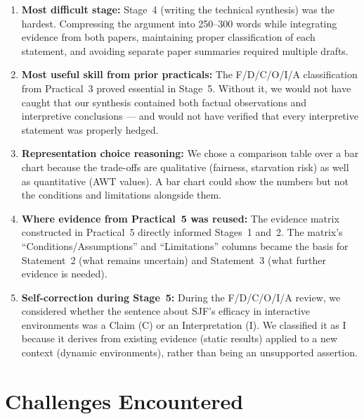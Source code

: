 \documentclass[11pt, a4paper]{article}
\begin{document}
\begin{enumerate}[nosep]
    \item \textbf{Most difficult stage:} Stage~4 (writing the technical synthesis) was the hardest. Compressing the argument into 250--300 words while integrating evidence from both papers, maintaining proper classification of each statement, and avoiding separate paper summaries required multiple drafts.

    \item \textbf{Most useful skill from prior practicals:} The F/D/C/O/I/A classification from Practical~3 proved essential in Stage~5. Without it, we would not have caught that our synthesis contained both factual observations and interpretive conclusions --- and would not have verified that every interpretive statement was properly hedged.

    \item \textbf{Representation choice reasoning:} We chose a comparison table over a bar chart because the trade-offs are qualitative (fairness, starvation risk) as well as quantitative (AWT values). A bar chart could show the numbers but not the conditions and limitations alongside them.

    \item \textbf{Where evidence from Practical~5 was reused:} The evidence matrix constructed in Practical~5 directly informed Stages~1 and~2. The matrix's ``Conditions/Assumptions'' and ``Limitations'' columns became the basis for Statement~2 (what remains uncertain) and Statement~3 (what further evidence is needed).

    \item \textbf{Self-correction during Stage~5:} During the F/D/C/O/I/A review, we considered whether the sentence about SJF's efficacy in interactive environments was a Claim (C) or an Interpretation (I). We classified it as I because it derives from existing evidence (static results) applied to a new context (dynamic environments), rather than being an unsupported assertion.
\end{enumerate}

\section{Challenges Encountered}
\end{document}
